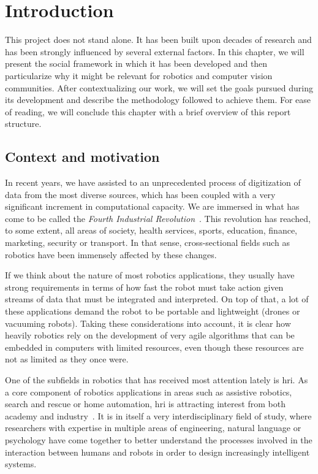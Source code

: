 \chapter{Introduction}\label{ch:introduction}
This project does not stand alone. It has been built upon decades of research and has been strongly influenced by several external factors. In this chapter, we will present the social framework in which it has been developed and then particularize why it might be relevant for robotics and computer vision communities. After contextualizing our work, we will set the goals pursued during its development and describe the methodology followed to achieve them. For ease of reading, we will conclude this chapter with a brief overview of this report structure.

\section{Context and motivation}\label{ch:context_and_motivation}
In recent years, we have assisted to an unprecedented process of digitization of data from the most diverse sources, which has been coupled with a very significant increment in computational capacity. We are immersed in what has
come to be called the \emph{Fourth Industrial Revolution}~\cite{schwab2017fourth}. This revolution has reached, to some extent, all areas of society, \eg health services, sports, education, finance, marketing, security or transport. In that sense, cross-sectional fields such as robotics have been immensely affected by these changes.

If we think about the nature of most robotics applications, they usually have strong requirements in terms of how fast the robot must take action given streams of data that must be integrated and interpreted. On top of that, a lot of these applications demand the robot to be portable and lightweight (\eg drones or vacuuming robots). Taking these considerations into account, it is clear how heavily robotics rely on the development of very agile algorithms that can be embedded in computers with limited resources, even though these resources are not as limited as they once were.

One of the subfields in robotics that has received most attention lately is \gls{hri}. As a core component of robotics applications in areas such as assistive robotics, search and rescue or home automation, \gls{hri} is attracting interest from both academy and industry~\cite{Goodrich2007}. It is in itself a very interdisciplinary field of study, where researchers with expertise in multiple areas of engineering, natural language or psychology have come together to better understand the processes involved in the interaction between humans and robots in order to design increasingly intelligent systems. 

